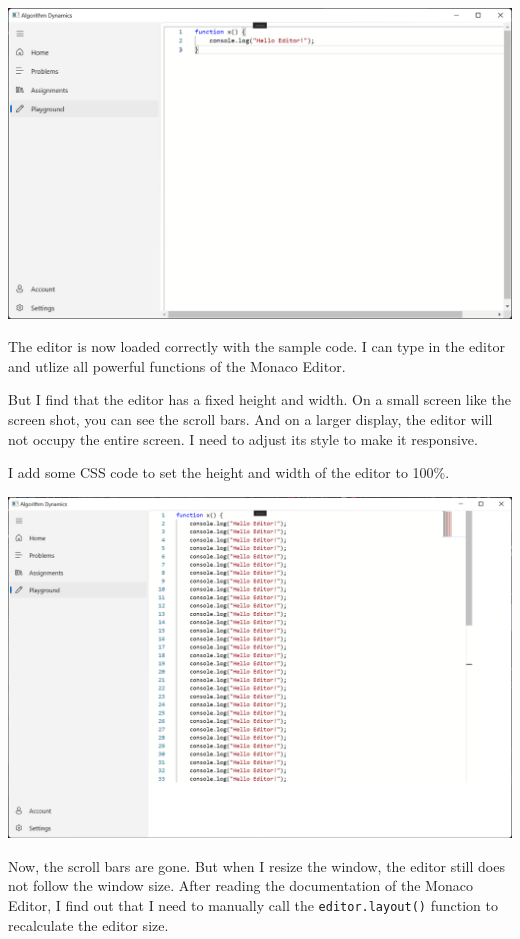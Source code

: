 \documentclass[a4paper]{report}
\begin{document}
\includegraphics[width=\textwidth, height=\textheight, keepaspectratio]{PlaygroundPage-WebView2-EditorLoaded}

The editor is now loaded correctly with the sample code. I can type in the editor and utlize all powerful functions of the Monaco Editor.

But I find that the editor has a fixed height and width. On a small screen like the screen shot, you can see the scroll bars. And on a larger display, the editor will not occupy the entire screen. I need to adjust its style to make it responsive.

I add some CSS code to set the height and width of the editor to 100\%.

\includegraphics[width=\textwidth, height=\textheight, keepaspectratio]{PlaygroundPage-WebView2-ResizeFailed}

Now, the scroll bars are gone. But when I resize the window, the editor still does not follow the window size. After reading the documentation of the Monaco Editor, I find out that I need to manually call the \verb|editor.layout()| function to recalculate the editor size.
\end{document}
